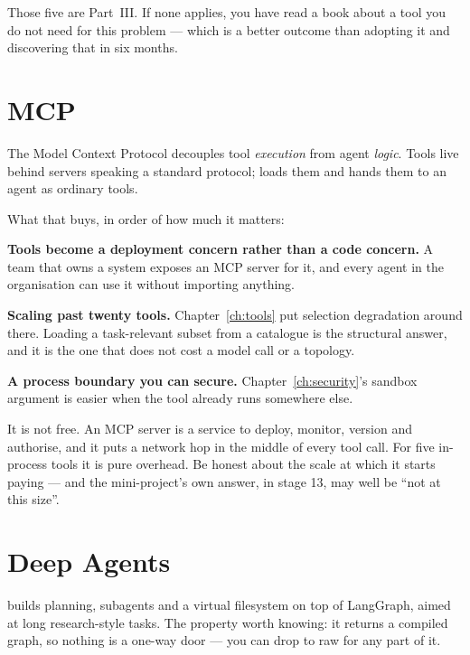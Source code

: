\begin{note}
Those five are Part~III. If none applies, you have read a book about a tool you
do not need for this problem --- which is a better outcome than adopting it and
discovering that in six months.
\end{note}

\section{MCP}
\label{sec:mcp}

The Model Context Protocol decouples tool \emph{execution} from agent
\emph{logic}. Tools live behind servers speaking a standard protocol;
 loads them and hands them to an agent as ordinary
tools.

What that buys, in order of how much it matters:

\textbf{Tools become a deployment concern rather than a code concern.} A team
that owns a system exposes an MCP server for it, and every agent in the
organisation can use it without importing anything.

\textbf{Scaling past twenty tools.} Chapter~\ref{ch:tools} put selection
degradation around there. Loading a task-relevant subset from a catalogue is the
structural answer, and it is the one that does not cost a model call or a
topology.

\textbf{A process boundary you can secure.} Chapter~\ref{ch:security}'s sandbox
argument is easier when the tool already runs somewhere else.

\begin{warning}
It is not free. An MCP server is a service to deploy, monitor, version and
authorise, and it puts a network hop in the middle of every tool call. For five
in-process tools it is pure overhead. Be honest about the scale at which it
starts paying --- and the mini-project's own answer, in stage 13, may well be
``not at this size''.
\end{warning}

\section{Deep Agents}
\label{sec:deep-agents}

 builds planning, subagents and a virtual filesystem on top of
LangGraph, aimed at long research-style tasks. The property worth knowing: it
returns a compiled graph, so nothing is a one-way door --- you can drop to raw
 for any part of it.

